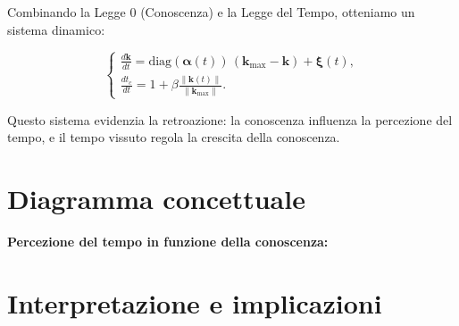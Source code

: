 \documentclass[12pt,a4paper]{article}
\begin{document}
Combinando la Legge 0 (Conoscenza) e la Legge del Tempo, otteniamo un sistema dinamico:

\[
\begin{cases}
\displaystyle \frac{d \bm{k}}{dt} = \text{diag}(\bm{\alpha}(t))\, (\bm{k}_{\max}-\bm{k}) + \bm{\xi}(t),\\[1mm]
\displaystyle \frac{dt_c}{dt} = 1 + \beta \frac{\|\bm{k}(t)\|}{\|\bm{k}_{\max}\|}.
\end{cases}
\]

Questo sistema evidenzia la retroazione: la conoscenza influenza la percezione del tempo, e il tempo vissuto regola la crescita della conoscenza.

\section{Diagramma concettuale}

\textbf{Percezione del tempo in funzione della conoscenza:}

\begin{center}
\end{center}

\caption*{La curva blu mostra come la percezione del tempo $t_c$ accelera con la conoscenza accumulata $\bm{k}(t)$. La linea rossa tratteggiata rappresenta il tempo lineare oggettivo.}

\section{Interpretazione e implicazioni}
\end{document}

